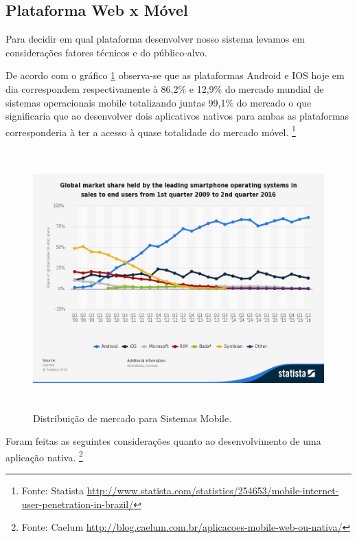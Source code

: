 \subsection{Plataforma Web x Móvel}
\par Para decidir em qual plataforma desenvolver nosso sistema levamos em considerações fatores técnicos e do público-alvo.
\par De acordo com o gráfico \ref{fig:global_market_sharing} observa-se que as plataformas Android e IOS hoje em dia correspondem respectivamente à 86,2\%  e 12,9\% do mercado mundial de sistemas operacionais mobile totalizando juntas 99,1\% do mercado o que significaria que ao desenvolver dois aplicativos nativos para ambas as plataformas corresponderia à ter a acesso à quase totalidade do mercado móvel. \footnote{Fonte: Statista   \url{http://www.statista.com/statistics/254653/mobile-internet-user-penetration-in-brazil/}}
\begin{figure}[htb]
\includegraphics[height=10cm]{figuras/global_market_sharing}
\caption{\label{fig:global_market_sharing} Distribuição de mercado para Sistemas Mobile.}
\end{figure}
\par Foram feitas  as seguintes considerações quanto ao desenvolvimento de uma aplicação nativa. \footnote{Fonte: Caelum \url{http://blog.caelum.com.br/aplicacoes-mobile-web-ou-nativa/}}
